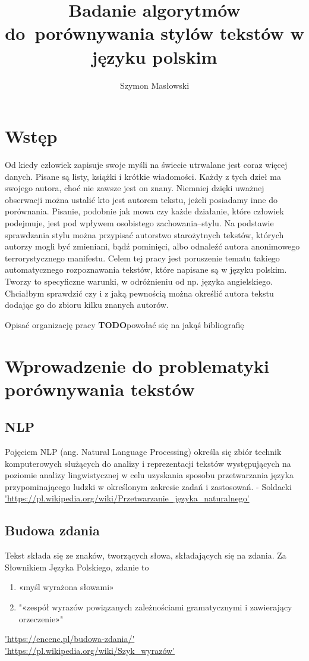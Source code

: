 \documentclass[a4paper,12pt,twoside,openany]{report}
\title{Badanie algorytmów \linebreak[1]do~porównywania stylów tekstów w języku polskim}
\author{Szymon Masłowski}
\newcommand{\TODO}{\textbf{TODO}}
\begin{document}
\maketitle

\chapter{Wstęp}

Od kiedy człowiek zapisuje swoje myśli na świecie utrwalane jest coraz więcej danych. Pisane są listy, książki i krótkie wiadomości. Każdy z tych dzieł ma swojego autora, choć nie zawsze jest on znany. Niemniej dzięki uważnej obserwacji można ustalić kto jest autorem tekstu, jeżeli posiadamy inne do porównania. Pisanie, podobnie jak mowa czy każde działanie, które człowiek podejmuje, jest pod wpływem osobistego zachowania--stylu. Na podstawie sprawdzania stylu można przypisać autorstwo starożytnych tekstów, których autorzy mogli być zmieniani, bądź pominięci, albo odnaleźć autora anonimowego terrorystycznego manifestu. 
Celem tej pracy jest poruszenie tematu takiego automatycznego rozpoznawania tekstów, które napisane są w języku polskim. Tworzy to specyficzne warunki, w odróżnieniu od np. języka angielskiego. Chciałbym sprawdzić czy i z jaką pewnością można określić autora tekstu dodając go do zbioru kilku znanych autorów.

Opisać organizację pracy
\TODO powołać się na jakąś bibliografię


\chapter{Wprowadzenie do problematyki porównywania tekstów}

\section{NLP}
Pojęciem NLP (ang. Natural Language Processing) określa się zbiór technik komputerowych służących do analizy i reprezentacji tekstów występujących na poziomie analizy lingwistycznej w celu uzyskania sposobu przetwarzania języka przypominającego ludzki w określonym zakresie zadań i zastosowań. - Soldacki
\url{'https://pl.wikipedia.org/wiki/Przetwarzanie_języka_naturalnego'}
	
\section{Budowa zdania}
Tekst składa się ze znaków, tworzących słowa, składających się na zdania. Za Słownikiem Języka Polskiego, zdanie to 
\begin{enumerate}
	\item «myśl wyrażona słowami»
	\item "«zespół wyrazów powiązanych zależnościami gramatycznymi i zawierający orzeczenie»"
\end{enumerate}
\url{'https://encenc.pl/budowa-zdania/'}
\url{'https://pl.wikipedia.org/wiki/Szyk_wyrazów'}
\end{document}
